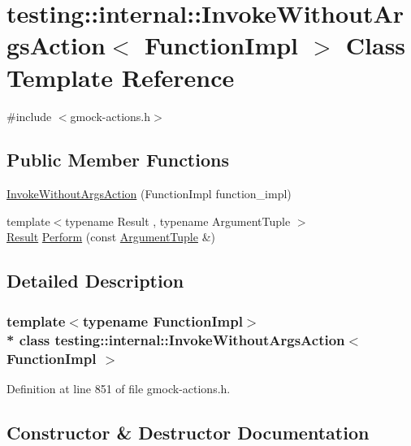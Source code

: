 \hypertarget{classtesting_1_1internal_1_1_invoke_without_args_action}{}\section{testing\+:\+:internal\+:\+:Invoke\+Without\+Args\+Action$<$ Function\+Impl $>$ Class Template Reference}
\label{classtesting_1_1internal_1_1_invoke_without_args_action}


{\ttfamily \#include $<$gmock-\/actions.\+h$>$}

\subsection*{Public Member Functions}
\begin{DoxyCompactItemize}
\item 
\hyperlink{classtesting_1_1internal_1_1_invoke_without_args_action_a05d4006d8ab70e78172bf678b1d15f18}{Invoke\+Without\+Args\+Action} (Function\+Impl function\+\_\+impl)
\item 
{\footnotesize template$<$typename Result , typename Argument\+Tuple $>$ }\\\hyperlink{typedefs__d_8js_a28287671eaf7406afd604bd055ba4066}{Result} \hyperlink{classtesting_1_1internal_1_1_invoke_without_args_action_abdad2b7d19ff1cbd1d07a4bd585e3f4c}{Perform} (const \hyperlink{typedefs__d_8js_a396b2bdc7ef45f482a7e9254b15c3c01}{Argument\+Tuple} \&)
\end{DoxyCompactItemize}


\subsection{Detailed Description}
\subsubsection*{template$<$typename Function\+Impl$>$\\*
class testing\+::internal\+::\+Invoke\+Without\+Args\+Action$<$ Function\+Impl $>$}



Definition at line 851 of file gmock-\/actions.\+h.



\subsection{Constructor \& Destructor Documentation}
